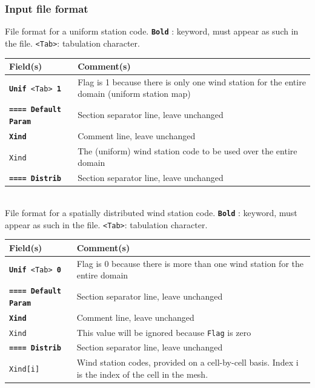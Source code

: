 \subsubsection{Input file format}
%
File format for a uniform station code.  \texttt{\textbf{Bold}} : keyword, must appear as such in the file. \texttt{<Tab>}: tabulation character. \\
    \begin{tabular}{p{6cm} | p{9cm}}
    \hline
    Field(s) & Comment(s) \\
    \hline  \hline
    \texttt{\textbf{Unif} <Tab> \textbf{1}} & Flag is 1 because there is only one wind station for the entire domain (uniform station map) \\ \hline
    \texttt{\textbf{==== Default Param}} & Section separator line, leave unchanged \\  \hline
    \texttt{\textbf{Xind}} & Comment line, leave unchanged \\  \hline
    \texttt{Xind } & The (uniform) wind station code to be used over the entire domain \\ \hline
    \texttt{\textbf{==== Distrib}} & Section separator line, leave unchanged \\  \hline
    \end{tabular}
%
\vspace{10mm} \\
%
File format for a spatially distributed wind station code.  \texttt{\textbf{Bold}} : keyword, must appear as such in the file. \texttt{<Tab>}: tabulation character. \\
    \begin{tabular}{p{6cm} | p{9cm}}
    \hline
    Field(s) & Comment(s) \\
    \hline  \hline
    \texttt{\textbf{Unif} <Tab> \textbf{0}} & Flag is 0 because there is more than one wind station for the entire domain \\ \hline
    \texttt{\textbf{==== Default Param}} & Section separator line, leave unchanged \\  \hline
    \texttt{\textbf{Xind}} & Comment line, leave unchanged \\  \hline
    \texttt{Xind } & This value will be ignored because \texttt{Flag} is zero \\ \hline
    \texttt{\textbf{==== Distrib}} & Section separator line, leave unchanged \\  \hline
    \texttt{Xind[i] }  & Wind station codes, provided on a cell-by-cell basis. Index i is the index of the cell in the mesh.  \\ \hline
    \end{tabular}
%
